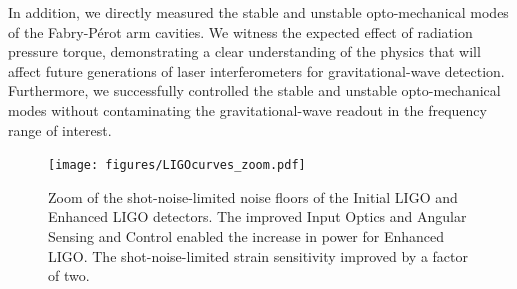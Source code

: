 In addition, we directly measured the stable and unstable
opto-mechanical modes of the Fabry-P\'{e}rot arm cavities. We witness
the expected effect of radiation pressure torque, demonstrating a
clear understanding of the physics that will affect future generations
of laser interferometers for gravitational-wave
detection. Furthermore, we successfully controlled the stable and
unstable opto-mechanical modes without contaminating the
gravitational-wave readout in the frequency range of interest.

\begin{figure}
\begin{centering}
\texttt{[image: figures/LIGOcurves\_zoom.pdf]}
\caption[Zoom of the shot-noise-limited noise floors of the Initial
LIGO and Enhanced LIGO detectors.]{Zoom of the shot-noise-limited
  noise floors of the Initial LIGO and Enhanced LIGO detectors. The
  improved Input Optics and Angular Sensing and Control enabled the
  increase in power for Enhanced LIGO. The shot-noise-limited strain
  sensitivity improved by a factor of two.}
\label{fig:LIGOcurves}
\end{centering}
\end{figure}


